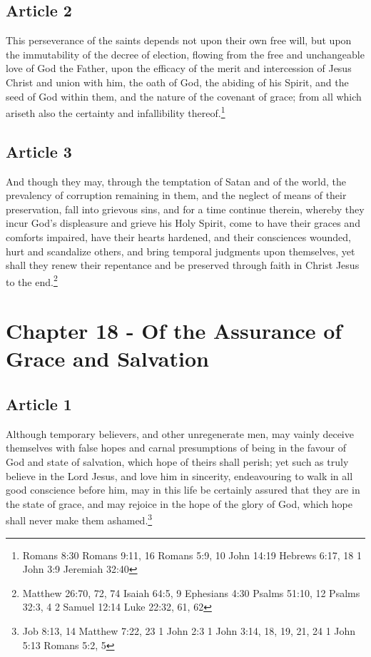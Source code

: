 \documentclass[12pt,letterpaper]{book}
\begin{document}
\section{Article 2}

This perseverance of the saints depends not upon their own free will, but upon the immutability of the decree of election, flowing from the free and unchangeable love of God the Father, upon the efficacy of the merit and intercession of Jesus Christ and union with him, the oath of God, the abiding of his Spirit, and the seed of God within them, and the nature of the covenant of grace; from all which ariseth also the certainty and infallibility thereof.\footnote{Romans 8:30 Romans 9:11, 16 Romans 5:9, 10 John 14:19 Hebrews 6:17, 18 1 John 3:9 Jeremiah 32:40}

\section{Article 3}

And though they may, through the temptation of Satan and of the world, the prevalency of corruption remaining in them, and the neglect of means of their preservation, fall into grievous sins, and for a time continue therein, whereby they incur God's displeasure and grieve his Holy Spirit, come to have their graces and comforts impaired, have their hearts hardened, and their consciences wounded, hurt and scandalize others, and bring temporal judgments upon themselves, yet shall they renew their repentance and be preserved through faith in Christ Jesus to the end.\footnote{Matthew 26:70, 72, 74 Isaiah 64:5, 9 Ephesians 4:30 Psalms 51:10, 12 Psalms 32:3, 4 2 Samuel 12:14 Luke 22:32, 61, 62}

\chapter{Chapter 18 - Of the Assurance of Grace and Salvation}
\section{Article 1}

Although temporary believers, and other unregenerate men, may vainly deceive themselves with false hopes and carnal presumptions of being in the favour of God and state of salvation, which hope of theirs shall perish; yet such as truly believe in the Lord Jesus, and love him in sincerity, endeavouring to walk in all good conscience before him, may in this life be certainly assured that they are in the state of grace, and may rejoice in the hope of the glory of God, which hope shall never make them ashamed.\footnote{Job 8:13, 14 Matthew 7:22, 23 1 John 2:3 1 John 3:14, 18, 19, 21, 24 1 John 5:13 Romans 5:2, 5}
\end{document}
